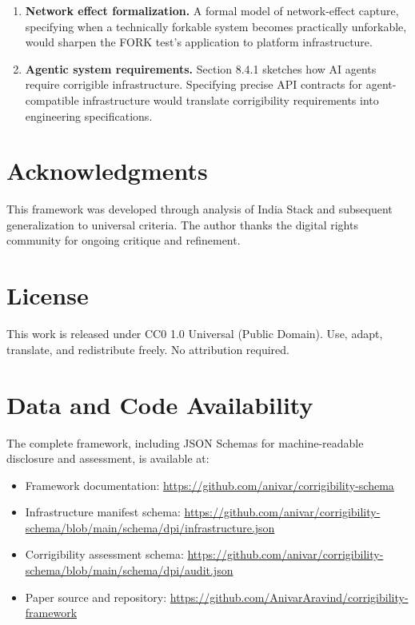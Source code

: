 \documentclass{article}
\begin{document}
\begin{enumerate}
    \item \textbf{Network effect formalization.} A formal model of network-effect capture, specifying when a technically forkable system becomes practically unforkable, would sharpen the FORK test's application to platform infrastructure.

    \item \textbf{Agentic system requirements.} Section 8.4.1 sketches how AI agents require corrigible infrastructure. Specifying precise API contracts for agent-compatible infrastructure would translate corrigibility requirements into engineering specifications.
\end{enumerate}

\section*{Acknowledgments}

This framework was developed through analysis of India Stack and subsequent generalization to universal criteria. The author thanks the digital rights community for ongoing critique and refinement.

\section*{License}

This work is released under CC0 1.0 Universal (Public Domain). Use, adapt, translate, and redistribute freely. No attribution required.

\section*{Data and Code Availability}

The complete framework, including JSON Schemas for machine-readable disclosure and assessment, is available at:

\begin{itemize}
    \item Framework documentation: \url{https://github.com/anivar/corrigibility-schema}
    \item Infrastructure manifest schema: \url{https://github.com/anivar/corrigibility-schema/blob/main/schema/dpi/infrastructure.json}
    \item Corrigibility assessment schema: \url{https://github.com/anivar/corrigibility-schema/blob/main/schema/dpi/audit.json}
    \item Paper source and repository: \url{https://github.com/AnivarAravind/corrigibility-framework}
\end{itemize}
\end{document}
